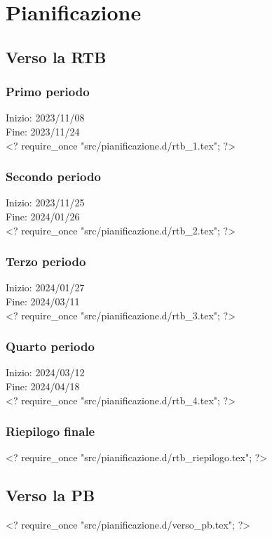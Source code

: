 \nonstopmode
\pagebreak
\section{Pianificazione}

\subsection{Verso la RTB}

\subsubsection{Primo periodo}
Inizio: 2023/11/08 \\
Fine: 2023/11/24 \\

<? require_once "src/pianificazione.d/rtb_1.tex"; ?>

\subsubsection{Secondo periodo}
Inizio: 2023/11/25 \\
Fine: 2024/01/26 \\

<? require_once "src/pianificazione.d/rtb_2.tex"; ?>

\subsubsection{Terzo periodo}
Inizio: 2024/01/27 \\
Fine: 2024/03/11 \\

<? require_once "src/pianificazione.d/rtb_3.tex"; ?>

\subsubsection{Quarto periodo}
Inizio: 2024/03/12 \\
Fine: 2024/04/18 \\

<? require_once "src/pianificazione.d/rtb_4.tex"; ?>

\subsubsection{Riepilogo finale}
<? require_once "src/pianificazione.d/rtb_riepilogo.tex"; ?>

\pagebreak
\subsection{Verso la PB}
<? require_once "src/pianificazione.d/verso_pb.tex"; ?>
